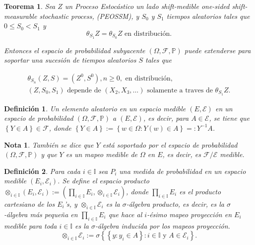 \documentclass{article}
\newtheorem{Def}{Definición}
\newtheorem{Teo}{Teorema}
\newtheorem{Note}{Nota}
\newcommand{\prob}{\mathbb{P}}
\begin{document}
\begin{Teo}
Sea $Z$ un Proceso Estoc\'astico un lado shift-medible \textit{one-sided shift-measurable stochastic process}, (PEOSSM),
y $S_{0}$ y $S_{1}$ tiempos aleatorios tales que $0\leq S_{0}<S_{1}$ y
\begin{equation}
\theta_{S_{1}}Z=\theta_{S_{0}}Z\textrm{ en distribuci\'on}.
\end{equation}

Entonces el espacio de probabilidad subyacente $\left(\Omega,\mathcal{F},\prob\right)$ puede extenderse para soportar una sucesi\'on de tiempos aleatorios $S$ tales que

\begin{eqnarray}
\theta_{S_{n}}\left(Z,S\right)=\left(Z^{0},S^{0}\right),n\geq0,\textrm{ en distribuci\'on},\\
\left(Z,S_{0},S_{1}\right)\textrm{ depende de }\left(X_{2},X_{3},\ldots\right)\textrm{ solamente a traves de }\theta_{S_{1}}Z.
\end{eqnarray}
\end{Teo}




\begin{Def}
Un elemento aleatorio en un espacio medible $\left(E,\mathcal{E}\right)$ en un espacio de probabilidad $\left(\Omega,\mathcal{F},\prob\right)$ a $\left(E,\mathcal{E}\right)$, es decir,
para $A\in \mathcal{E}$,  se tiene que $\left\{Y\in A\right\}\in\mathcal{F}$, donde $\left\{Y\in A\right\}:=\left\{w\in\Omega:Y\left(w\right)\in A\right\}=:Y^{-1}A$.
\end{Def}

\begin{Note}
Tambi\'en se dice que $Y$ est\'a soportado por el espacio de probabilidad $\left(\Omega,\mathcal{F},\prob\right)$ y que $Y$ es un mapeo medible de $\Omega$ en $E$, es decir, es $\mathcal{F}/\mathcal{E}$ medible.
\end{Note}

\begin{Def}
Para cada $i\in \mathbb{I}$ sea $P_{i}$ una medida de probabilidad en un espacio medible $\left(E_{i},\mathcal{E}_{i}\right)$. Se define el espacio producto
$\otimes_{i\in\mathbb{I}}\left(E_{i},\mathcal{E}_{i}\right):=\left(\prod_{i\in\mathbb{I}}E_{i},\otimes_{i\in\mathbb{I}}\mathcal{E}_{i}\right)$, donde $\prod_{i\in\mathbb{I}}E_{i}$ es el producto cartesiano de los $E_{i}$'s, y $\otimes_{i\in\mathbb{I}}\mathcal{E}_{i}$ es la $\sigma$-\'algebra producto, es decir, es la $\sigma$-\'algebra m\'as peque\~na en $\prod_{i\in\mathbb{I}}E_{i}$ que hace al $i$-\'esimo mapeo proyecci\'on en $E_{i}$ medible para toda $i\in\mathbb{I}$ es la $\sigma$-\'algebra inducida por los mapeos proyecci\'on. $$\otimes_{i\in\mathbb{I}}\mathcal{E}_{i}:=\sigma\left\{\left\{y:y_{i}\in A\right\}:i\in\mathbb{I}\textrm{ y }A\in\mathcal{E}_{i}\right\}.$$
\end{Def}
\end{document}
